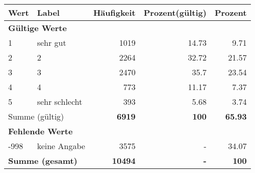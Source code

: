      \begin{longtable}{lXrrr}
     \toprule
     \textbf{Wert} & \textbf{Label} & \textbf{Häufigkeit} & \textbf{Prozent(gültig)} & \textbf{Prozent} \\
     \endhead
     \midrule
     \multicolumn{5}{l}{\textbf{Gültige Werte}}\\

     1 &
     \multicolumn{1}{X}{ sehr gut   } &


       \num{1019} &
       \num[round-mode=places,round-precision=2]{14,73} &
         \num[round-mode=places,round-precision=2]{9,71} \\

     2 &
     \multicolumn{1}{X}{ 2   } &


       \num{2264} &
       \num[round-mode=places,round-precision=2]{32,72} &
         \num[round-mode=places,round-precision=2]{21,57} \\

     3 &
     \multicolumn{1}{X}{ 3   } &


       \num{2470} &
       \num[round-mode=places,round-precision=2]{35,7} &
         \num[round-mode=places,round-precision=2]{23,54} \\

     4 &
     \multicolumn{1}{X}{ 4   } &


       \num{773} &
       \num[round-mode=places,round-precision=2]{11,17} &
         \num[round-mode=places,round-precision=2]{7,37} \\

     5 &
     \multicolumn{1}{X}{ sehr schlecht   } &


       \num{393} &
       \num[round-mode=places,round-precision=2]{5,68} &
         \num[round-mode=places,round-precision=2]{3,74} \\
     \midrule
     \multicolumn{2}{l}{Summe (gültig)} &
       \textbf{\num{6919}} &
     \textbf{100} &
       \textbf{\num[round-mode=places,round-precision=2]{65,93}} \\
     \multicolumn{5}{l}{\textbf{Fehlende Werte}}\\
       -998 &
       keine Angabe &
         \num{3575} &
        - &
         \num[round-mode=places,round-precision=2]{34,07} \\
     \midrule
     \multicolumn{2}{l}{\textbf{Summe (gesamt)}} &
          \textbf{\num{10494}} &
        \textbf{-} &
        \textbf{100} \\
     \bottomrule
     \end{longtable}
     

